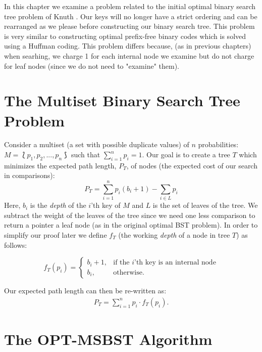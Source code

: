 \documentclass[letterpaper,12pt,titlepage,oneside,final]{book}
\theoremstyle{plain}
\begin{document}
In this chapter we examine a problem related to the initial optimal binary search tree problem of Knuth \cite{knuth1971optimum}. Our keys will no longer have a strict ordering and can be rearranged as we please before constructing our binary search tree. This problem is very similar to constructing optimal prefix-free binary codes which is solved using a Huffman coding. This problem differs because, (as in previous chapters) when searhing, we charge 1 for each internal node we examine but do not charge for leaf nodes (since we do not need to "examine" them).

\section{The Multiset Binary Search Tree Problem}\label{The Multiset Binary Search Tree Problem}

 Consider a multiset (a set with possible duplicate values) of $n$ probabilities: $M = \lbag p_1, p_2, ..., p_n \rbag$ such that $\sum\limits_{i=1}^n p_i = 1$. Our goal is to create a tree $T$ which minimizes the expected path length, $P_T$, of nodes (the expected cost of our search in comparisons):
\begin{equation}
P_T = \sum_{i=1}^{n} p_i(b_i+1) - \sum_{i \in L}p_i
\end{equation}
Here, $b_i$ is the \emph{depth} of the $i$'th key of $M$ and $L$ is the set of leaves of the tree. We subtract the weight of the leaves of the tree since we need one less comparison to return a pointer a leaf node (as in the original optimal BST problem). In order to simplify our proof later we define $f_T$ (the working \emph{depth} of a node in tree $T$) as follows:
\begin{center}
\[
    f_T(p_i)= 
\begin{cases}
    b_i+1,& \text{if the } i \text{'th key is an internal node}\\
    b_i,              & \text{otherwise}.
\end{cases}
\]
\end{center}
Our expected path length can then be re-written as:
\begin{align*}
P_T = \sum_{i=1}^{n} p_i\cdot f_T(p_i).
\end{align*}

\section{The OPT-MSBST Algorithm}\label{OPT-MSBST}
\end{document}

